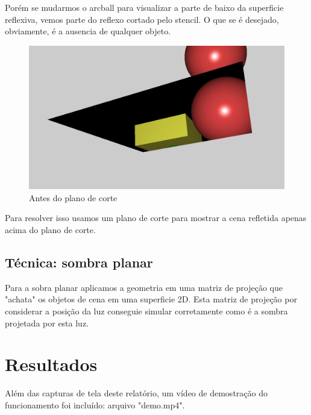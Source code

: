 \documentclass[11pt, a4paper]{article}
\begin{document}
Porém se mudarmos o arcball para visualizar a parte de baixo da superficie reflexiva, 
vemos parte do reflexo cortado pelo stencil. O que se é desejado, obviamente, é 
a ausencia de qualquer objeto.

\begin{figure}[H]
  \begin{center}
  \includegraphics[width=0.8\linewidth]{before-cut-plan.png}
  \caption{Antes do plano de corte}
  \label{fig:vaz}
  \end{center}
\end{figure}

Para resolver isso usamos um plano de corte para mostrar a cena refletida apenas
acima do plano de corte.


\subsection {Técnica: sombra planar}

Para a sobra planar aplicamos a geometria em uma matriz de projeção que "achata"
os objetos de cena em uma superficie 2D. Esta matriz de projeção por considerar a posição da luz
conseguie simular corretamente como é a sombra projetada por esta luz.

\section {Resultados}

Além das capturas de tela deste relatório, um vídeo de demostração do funcionamento 
foi incluído: arquivo "demo.mp4".
\end{document}
